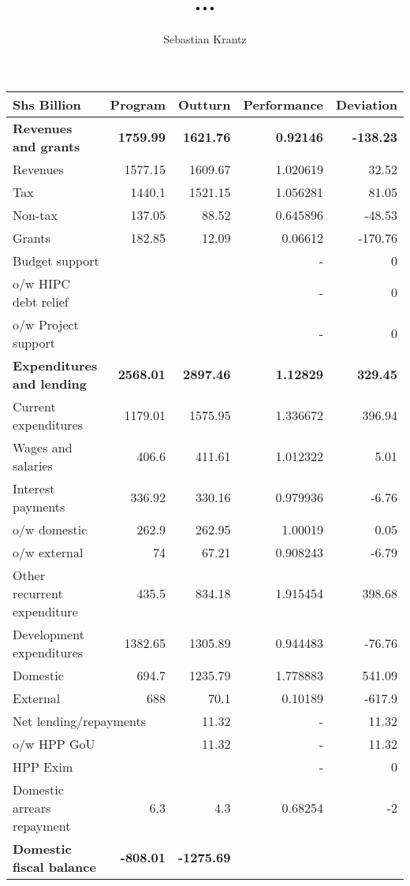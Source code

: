 \documentclass[a4paper]{article}
\title{\textbf{...}}
\author{Sebastian Krantz}
\begin{document}
\maketitle

\begin{table}[]
\begin{tabular}{@{}lrrrr@{}}
\toprule
\textbf{Shs Billion} & \textbf{Program} & \textbf{Outturn} & \textbf{Performance} & \textbf{Deviation} \\ \midrule
\textbf{Revenues and grants} & \textbf{1759.99} & \textbf{1621.76} & \textbf{0.92146} & \textbf{-138.23} \\ \midrule
Revenues & 1577.15 & 1609.67 & 1.020619 & 32.52 \\
Tax & 1440.1 & 1521.15 & 1.056281 & 81.05 \\
Non-tax & 137.05 & 88.52 & 0.645896 & -48.53 \\
\hspace{1cm} Grants & 182.85 & 12.09 & 0.06612 & -170.76 \\
\multicolumn{2}{l}{Budget support} &  & - & 0 \\
o/w HIPC debt relief &  &  & - & 0 \\
o/w Project support &  &  & - & 0 \\ \midrule
\textbf{Expenditures and lending} & \textbf{2568.01} & \textbf{2897.46} & \textbf{1.12829} & \textbf{329.45} \\
Current expenditures & 1179.01 & 1575.95 & 1.336672 & 396.94 \\
Wages and salaries & 406.6 & 411.61 & 1.012322 & 5.01 \\
Interest payments & 336.92 & 330.16 & 0.979936 & -6.76 \\
o/w domestic & 262.9 & 262.95 & 1.00019 & 0.05 \\
o/w external & 74 & 67.21 & 0.908243 & -6.79 \\
Other recurrent expenditure & 435.5 & 834.18 & 1.915454 & 398.68 \\
Development expenditures & 1382.65 & 1305.89 & 0.944483 & -76.76 \\
Domestic & 694.7 & 1235.79 & 1.778883 & 541.09 \\
External & 688 & 70.1 & 0.10189 & -617.9 \\
\multicolumn{2}{l}{Net lending/repayments} & 11.32 & - & 11.32 \\
\multicolumn{2}{l}{o/w HPP GoU} & 11.32 & - & 11.32 \\
\multicolumn{2}{l}{HPP Exim} &  & - & 0 \\
Domestic arrears repayment & 6.3 & 4.3 & 0.68254 & -2 \\ \midrule
\textbf{Domestic fiscal balance} & \textbf{-808.01} & \textbf{-1275.69} & \textbf{} & \textbf{} \\ \bottomrule
\end{tabular}
\end{table}
\end{document}
